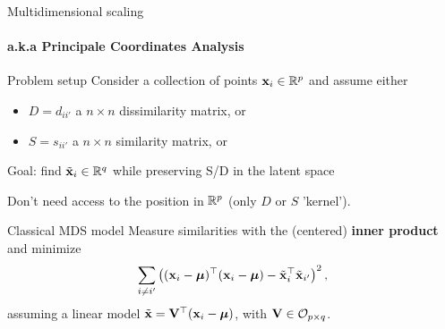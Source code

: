 \documentclass{beamer}\usepackage[]{graphicx}\usepackage[]{color}
\begin{document}
\begin{frame}{Multidimensional scaling}
  \framesubtitle{a.k.a Principale Coordinates Analysis}

  \begin{block}{Problem setup}
  Consider a collection of points $\mathbf{x}_i\in\mathbb{R}^p$ and assume either 
  \begin{itemize}
  \item $D = d_{ii'}$ a $n\times n$ dissimilarity matrix, or
  \item $S = s_{ii'}$ a $n\times n$ similarity matrix, or
  \end{itemize}
  \alert{Goal:} find $\tilde{\mathbf{x}}_i\in\mathbb{R}^q$ while preserving S/D in the latent space\\
  \end{block}
  
  \rsa Don't need access to the position in $\mathbb{R}^p$ (only $D$ or $S$ \rsa 'kernel').


  \begin{block}{Classical MDS model}
    Measure similarities with the (centered) \alert{\bf inner product} and minimize 
    \begin{equation*}
      \sum_{i\neq i'} \left( (\mathbf{x}_i - \boldsymbol{\mu})^\top (\mathbf{x}_i - \boldsymbol{\mu}) - \tilde{\mathbf{x}}_i^\top \tilde{\mathbf{x}}_{i'} \right)^2,
    \end{equation*}
    assuming a linear model $\tilde{\mathbf{x}} =  \mathbf{V}^\top (\mathbf{x}_i - \boldsymbol{\mu})$, with $\mathbf{V} \in \mathcal{O}_{p \times q}$.  \end{block}

\end{frame}
\end{document}
